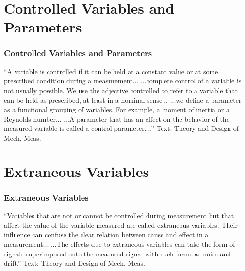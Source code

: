 \documentclass[fleqn]{beamer} %
\newcommand{\sectiontitleIII}{Controlled Variables and Parameters}
\newcommand{\sectiontitleIV}{Extraneous Variables}
\begin{document}
\section{\sectiontitleIII}
	\begin{frame}[label=sectionIII]
		\frametitle{\sectiontitleIII}

		{``A variable is {\BL controlled} if it can be held at a constant value
		or at some prescribed condition during a measurement... ...complete control of a variable is not usually
		possible. We use the adjective {\BL controlled} to refer to a variable that can be held as prescribed, at
		least in a nominal sense... \vspc
		...we define a {\GR parameter} as a functional grouping of variables. For example, a moment of inertia or a Reynolds number... ...A {\GR parameter} that has an effect on the behavior of the measured variable is called a control parameter....''} \vspc
		{\tiny Text: Theory and Design of Mech. Meas.}

	\end{frame}

\section{\sectiontitleIV}
	\begin{frame}[label=sectionIV]
		\frametitle{\sectiontitleIV}

		{``Variables that are not or cannot be controlled during measurement but that affect the value of the
		variable measured are called {\RD extraneous variables}. Their influence can confuse the clear relation
		between cause and effect in a measurement... ...The effects due to {\RD extraneous variables} can take the form of signals superimposed
		onto the measured signal with such forms as {\PR noise} and drift.''} \vspc
		{\tiny Text: Theory and Design of Mech. Meas.}

	\end{frame}

\end{document}

